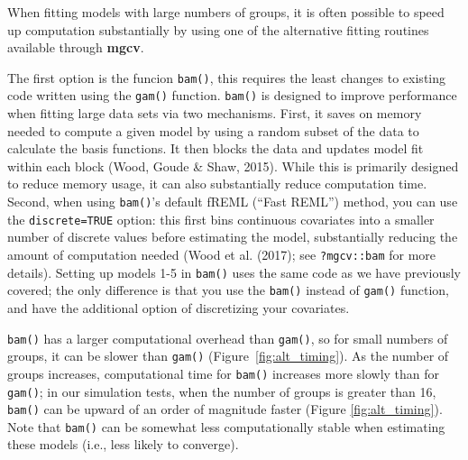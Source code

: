 \documentclass[12pt]{article}
\begin{document}
When fitting models with large numbers of groups, it is often possible
to speed up computation substantially by using one of the alternative
fitting routines available through \textbf{mgcv}.

The first option is the funcion \texttt{bam()}, this requires the least
changes to existing code written using the \texttt{gam()} function.
\texttt{bam()} is designed to improve performance when fitting large
data sets via two mechanisms. First, it saves on memory needed to
compute a given model by using a random subset of the data to calculate
the basis functions. It then blocks the data and updates model fit
within each block (Wood, Goude \& Shaw, 2015). While this is primarily
designed to reduce memory usage, it can also substantially reduce
computation time. Second, when using \texttt{bam()}'s default fREML
(``Fast REML'') method, you can use the \texttt{discrete=TRUE} option:
this first bins continuous covariates into a smaller number of discrete
values before estimating the model, substantially reducing the amount of
computation needed (Wood et al. (2017); see \texttt{?mgcv::bam} for more
details). Setting up models 1-5 in \texttt{bam()} uses the same code as
we have previously covered; the only difference is that you use the
\texttt{bam()} instead of \texttt{gam()} function, and have the
additional option of discretizing your covariates.

\texttt{bam()} has a larger computational overhead than \texttt{gam()},
so for small numbers of groups, it can be slower than \texttt{gam()}
(Figure~\ref{fig:alt_timing}). As the number of groups increases,
computational time for \texttt{bam()} increases more slowly than for
\texttt{gam()}; in our simulation tests, when the number of groups is
greater than 16, \texttt{bam()} can be upward of an order of magnitude
faster (Figure \ref{fig:alt_timing}). Note that \texttt{bam()} can be
somewhat less computationally stable when estimating these models (i.e.,
less likely to converge).
\end{document}
